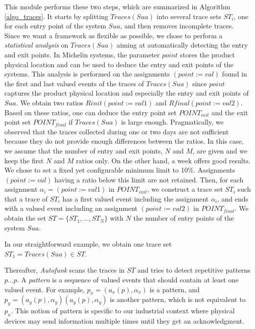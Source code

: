 This module performs these two steps, which are summarized in
Algorithm \ref{algo_traces}. It starts by splitting $Traces(Sua)$
into several trace sets $ST_i$, one for each entry point of the
system $\mathit{Sua}$, and then removes incomplete traces. Since
we want a framework as flexible as possible, we chose to perform
a \emph{statistical analysis} on $Traces(Sua)$ aiming at
automatically detecting the entry and exit points.  In Michelin
systems, the parameter $point$ stores the product physical
location and can be used to deduce the entry and exit points of
the systems.
This analysis is performed on the assignments $(point:=val)$
found in the first and last valued events of the traces of
$Traces(Sua)$ since $point$ captures the product physical
location and especially the entry and exit points of $\mathit{Sua}$.
We obtain two ratios $Rinit(point:=val1)$ and
$Rfinal(point:=val2)$.  Based on these ratios, one can deduce the
entry point set $POINT_{init}$ and the exit point set
$POINT_{final}$ if $Traces(Sua)$ is large enough. Pragmatically,
we observed that the traces collected during one or two days are
not sufficient because they do not provide enough differences
between the ratios. In this case, we assume that the number of
entry and exit points, $N$ and $M$, are given and we keep the
first $N$ and $M$ ratios only. On the other hand, a week offers
good results. We chose to set a fixed yet configurable
minimum limit to 10\%. Assignments $(point:=val)$ having a ratio
below this limit are not retained. Then, for each assignment
$\alpha_i=(point:=val1)$ in $POINT_{init}$, we construct a trace
set $ST_i$ such that a trace of $ST_i$ has a first valued event
including the assignment $\alpha_i$, and ends with a valued event
including an assignment $(point:=val2)$ in $POINT_{final}$. We
obtain the set $ST=\{ST_1,\dots,ST_N\}$ with $N$ the number of
entry points of the system $\mathit{Sua}$.

\begin{example}
In our straightforward example, we obtain one trace set
$ST_1 = Traces(Sua) \in ST$.
\end{example}

Thereafter, \textit{Autofunk} scans the traces in $ST$ and tries
to detect repetitive patterns $p \dots p$. A \emph{pattern} is a
sequence of valued events that should contain at least one valued
event. For example, $p_x = (a_x(p), \alpha_x)$ is a pattern, and
$p_{y} = (a_y(p), \alpha_y) (a_y(p), \alpha_y)$ is another
pattern, which is not equivalent to $p_x$. This notion of pattern
is specific to our industrial context where physical devices may
send information multiple times until they get an acknowledgment.

